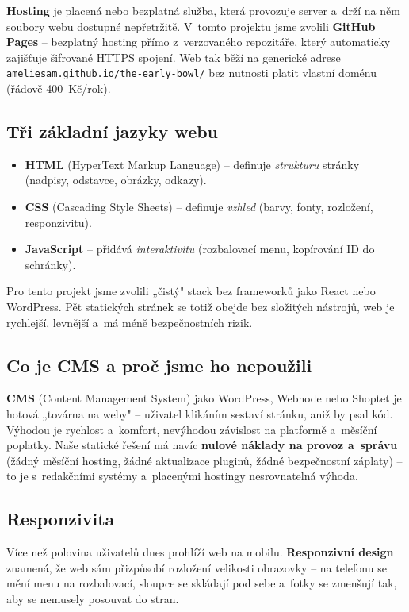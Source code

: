 \documentclass[12pt,a4paper]{article}
\begin{document}
\textbf{Hosting} je placená nebo bezplatná služba, která provozuje server a~drží na něm soubory webu dostupné nepřetržitě. V~tomto projektu jsme zvolili \textbf{GitHub Pages} -- bezplatný hosting přímo z~verzovaného repozitáře, který automaticky zajišťuje šifrované HTTPS spojení. Web tak běží na generické adrese \texttt{ameliesam.github.io/the-early-bowl/} bez nutnosti platit vlastní doménu (řádově 400~Kč/rok).

\subsection{Tři základní jazyky webu}

\begin{itemize}
  \item \textbf{HTML} (HyperText Markup Language) -- definuje \emph{strukturu} stránky (nadpisy, odstavce, obrázky, odkazy).
  \item \textbf{CSS} (Cascading Style Sheets) -- definuje \emph{vzhled} (barvy, fonty, rozložení, responzivitu).
  \item \textbf{JavaScript} -- přidává \emph{interaktivitu} (rozbalovací menu, kopírování ID do schránky).
\end{itemize}

Pro tento projekt jsme zvolili „čistý" stack bez frameworků jako React nebo WordPress. Pět statických stránek se totiž obejde bez složitých nástrojů, web je rychlejší, levnější a~má méně bezpečnostních rizik.

\subsection{Co je CMS a proč jsme ho nepoužili}

\textbf{CMS} (Content Management System) jako WordPress, Webnode nebo Shoptet je hotová „továrna na weby" -- uživatel klikáním sestaví stránku, aniž by psal kód. Výhodou je rychlost a~komfort, nevýhodou závislost na platformě a~měsíční poplatky. Naše statické řešení má navíc \textbf{nulové náklady na provoz a~správu} (žádný měsíční hosting, žádné aktualizace pluginů, žádné bezpečnostní záplaty) -- to je s~redakčními systémy a~placenými hostingy nesrovnatelná výhoda.

\subsection{Responzivita}

Více než polovina uživatelů dnes prohlíží web na mobilu. \textbf{Responzivní design} znamená, že web sám přizpůsobí rozložení velikosti obrazovky -- na telefonu se mění menu na rozbalovací, sloupce se skládají pod sebe a~fotky se zmenšují tak, aby se nemusely posouvat do stran.
\end{document}
